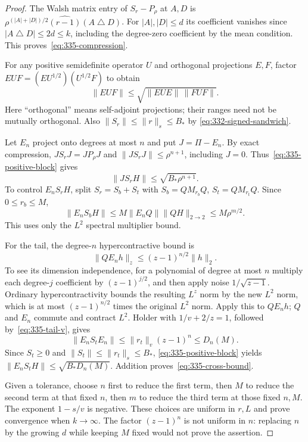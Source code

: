 \begin{proof}
The Walsh matrix entry of $S_r-P_\rho$ at $A,D$ is
$\rho^{(|A|+|D|)/2}\widehat{(r-1)}(A\mathbin\triangle D)$.
For $|A|,|D|\le d$ its coefficient vanishes since
$|A\mathbin\triangle D|\le2d\le k$, including the degree-zero
coefficient by the mean condition. This proves~\eqref{eq:335-compression}.

For any positive semidefinite operator $U$ and orthogonal projections
$E,F$, factor $EUF=(EU^{1/2})(U^{1/2}F)$ to obtain
\begin{equation}\label{eq:335-positive-block}
 \|EUF\|\le\sqrt{\|EUE\|\,\|FUF\|}.
\end{equation}
Here ``orthogonal'' means self-adjoint projections; their ranges need
not be mutually orthogonal. Also
$\|S_r\|\le\|r\|_s\le B_*$ by
\eqref{eq:332-signed-sandwich}.

Let $E_n$ project onto degrees at most $n$ and put $J=\Pi-E_n$.
By exact compression,
$JS_rJ=JP_\rho J$ and $\|JS_rJ\|\le\rho^{n+1}$, including $J=0$.
Thus~\eqref{eq:335-positive-block} gives
\[
 \|JS_rH\|\le\sqrt{B_*\rho^{n+1}}.
\]
To control $E_nS_rH$, split $S_r=S_b+S_t$ with
$S_b=QM_{r_b}Q$, $S_t=QM_{r_t}Q$. Since $0\le r_b\le M$,
\[
 \|E_nS_bH\|\le M\|E_nQ\|\|QH\|_{2\to2}
 \le M\rho^{m/2}.
\]
This uses only the $L^2$ spectral multiplier bound.

For the tail, the degree-$n$ hypercontractive bound is
\[
 \|QE_nh\|_z\le(z-1)^{n/2}\|h\|_2.
\]
To see its dimension independence, for a polynomial of degree at most
$n$ multiply each degree-$j$ coefficient by $(z-1)^{j/2}$, and then
apply noise $1/\sqrt{z-1}$. Ordinary hypercontractivity bounds the
resulting $L^z$ norm by the new $L^2$ norm, which is at most
$(z-1)^{n/2}$ times the original $L^2$ norm. Apply this to $QE_nh$;
$Q$ and $E_n$ commute and contract $L^2$.
Holder with $1/v+2/z=1$, followed by~\eqref{eq:335-tail-v}, gives
\[
 \|E_nS_tE_n\|\le\|r_t\|_v(z-1)^n\le D_n(M).
\]
Since $S_t\ge0$ and $\|S_t\|\le\|r_t\|_s\le B_*$,
\eqref{eq:335-positive-block} yields
$\|E_nS_tH\|\le\sqrt{B_*D_n(M)}$.
Addition proves~\eqref{eq:335-cross-bound}.

Given a tolerance, choose $n$ first to reduce the first term, then $M$
to reduce the second term at that fixed $n$, then $m$ to reduce the
third term at those fixed $n,M$. The exponent $1-s/v$ is negative.
These choices are uniform in $r,L$ and prove convergence when $k\to\infty$.
The factor $(z-1)^n$ is not uniform in $n$: replacing $n$ by the growing
$d$ while keeping $M$ fixed would not prove the assertion.
\end{proof}

